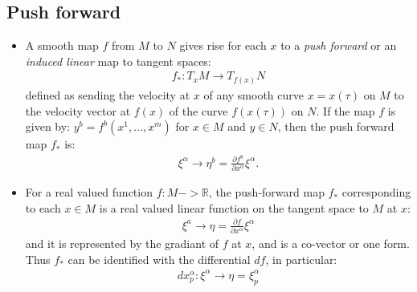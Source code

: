 \documentclass[11pt]{article}
\numberwithin{equation}{section}
\DeclareRobustCommand{\RR}{\mathbb{R}}
\begin{document}
\subsection{Push forward}
\begin{itemize}
  \item A smooth map $f$ from $M$ to $N$ gives rise for each $x$ to a \emph{push forward} or an \emph{induced linear} map to tangent spaces:
  \begin{align*}
      f_{\ast}: T_{x}M \rightarrow T_{f(x)}N
    \end{align*}  
    defined as sending the velocity at $x$ of any smooth curve $x =x(\tau)$ on $M$ to the velocity vector at $f(x)$ of the curve $f(x(\tau))$ on $N$. If the map $f$ is given by: $y^b = f^b(x^{1},\ldots,x^m)$ for $x \in M$ and $y \in N$, then the push forward map $f_{\ast}$ is:
    \begin{align*}
      \xi^{\alpha} \rightarrow \eta^{b} = \frac{\partial f^{b}}{\partial x^{\alpha}}\xi^{\alpha}. 
    \end{align*}

    \item For a real valued function $f: M -> \RR$, the push-forward map $f_{\ast}$ corresponding to each $x\in M$ is a real valued linear function on the tangent space to $M$ at $x$: 
    \begin{align*}
      \xi^{a} \rightarrow \eta = \frac{\partial f}{\partial x^{\alpha}}\xi^{\alpha}
    \end{align*}
    and it is represented by the gradiant of $f$ at $x$, and is a co-vector or one form. Thus $f_{\ast}$ can be identified with the differential $df$, in particular:
    \begin{align*}
      dx^{\alpha}_{p}: \xi^{\alpha}\rightarrow\eta =\xi^{\alpha}_{p}
    \end{align*}
\end{itemize}
\end{document}
